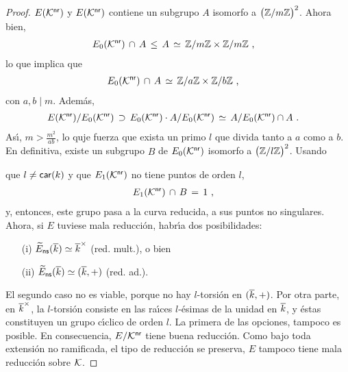 \begin{proof}
	$E(\closnr{\cal K})$ y $E(\closnr{\cal K})$ contiene un subgrupo $A$
	isomorfo a $\big(\bb Z/m\bb Z\big)^2$. Ahora bien,
	\begin{align*}
		E_0(\closnr{\cal K})\,\cap\,A & \,\leq\, A\,\simeq\,
			\bb Z/m\bb Z\times\bb Z/m\bb Z
		\text{ ,}
	\end{align*}
	lo que implica que
	\begin{align*}
		E_0(\closnr{\cal K})\,\cap\,A & \,\simeq\,
			\bb Z/a\bb Z\times\bb Z/b\bb Z
		\text{ ,}
	\end{align*}
	con $a,b\mid m$. Adem\'{a}s,
	\begin{align*}
		E(\closnr{\cal K})/E_0(\closnr{\cal K}) & \,\supset\,
			E_0(\closnr{\cal K})\cdot A/E_0(\closnr{\cal K})
			\,\simeq\,A/E_0(\closnr{\cal K})\cap A
		\text{ .}
	\end{align*}
	As\'{\i}, $m>\frac{m^2}{ab}$, lo quje fuerza que exista un primo $l$
	que divida tanto a $a$ como a $b$. En definitiva, existe un subgrupo
	$B$ de $E_0(\closnr{\cal K})$ isomorfo a $\big(\bb Z/l\bb Z\big)^2$.
	Usando
	\begin{center}
	\end{center}
	que $l\not =\char k$ y que $E_1(\closnr{\cal K})$ no tiene puntos de
	orden $l$,
	\begin{align*}
		E_1(\closnr{\cal K})\,\cap\,B & \,=\,1
		\text{ ,}
	\end{align*}
	y, entonces, este grupo pasa a la curva reducida, a sus puntos no
	singulares. Ahora, si $E$ tuviese mala reducci\'{o}n, habr\'{\i}a dos
	posibilidades:
	\begin{itemize}
		\item[(i)] $\redns{E}(\clos k)\simeq\clos k^\times$
			(red. mult.), o bien
		\item[(ii)] $\redns{E}(\clos k)\simeq (\clos k,+)$ (red. ad.).
	\end{itemize}
	El segundo caso no es viable, porque no hay $l$-torsi\'{o}n en
	$(\clos k,+)$. Por otra parte, en $\clos k^\times$, la $l$-torsi\'{o}n
	consiste en las ra\'{\i}ces $l$-\'{e}simas de la unidad en $\clos k$, y
	\'{e}stas constituyen un grupo c\'{\i}clico de orden $l$. La primera de
	las opciones, tampoco es posible. En consecuencia, $E/\closnr{\cal K}$
	tiene buena reducci\'{o}n. Como bajo toda extensi\'{o}n no ramificada,
	el tipo de reducci\'{o}n se preserva, $E$ tampoco tiene mala
	reducci\'{o}n sobre $\cal K$.
\end{proof}

